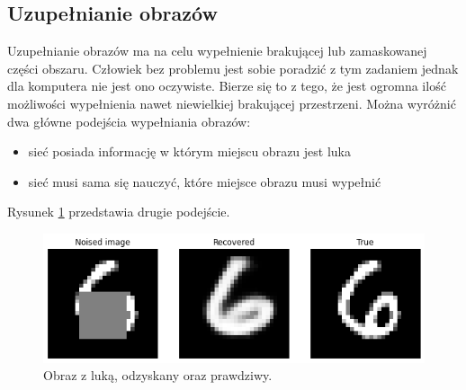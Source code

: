 \documentclass[a4paper,12pt]{book} %
\begin{document}
\subsection{Uzupełnianie obrazów}
Uzupełnianie obrazów ma na celu wypełnienie brakującej lub zamaskowanej części obszaru. Człowiek bez problemu jest sobie poradzić z tym zadaniem jednak dla komputera nie jest ono oczywiste. Bierze się to z tego, że jest ogromna ilość możliwości wypełnienia nawet niewielkiej brakującej przestrzeni. 
Można wyróżnić dwa główne podejścia wypełniania obrazów:
\begin{itemize}
	\item sieć posiada informację w którym miejscu obrazu jest luka
	\item sieć musi sama się nauczyć, które miejsce obrazu musi wypełnić
\end{itemize}
Rysunek \ref{fig:lukaae} przedstawia drugie podejście. 
\begin{figure}[h]
	\centering\includegraphics[width=14.5cm]{pictures/completion1.png}
	\caption{Obraz z luką, odzyskany oraz prawdziwy.}
	\label{fig:lukaae}
\end{figure}
\end{document}

